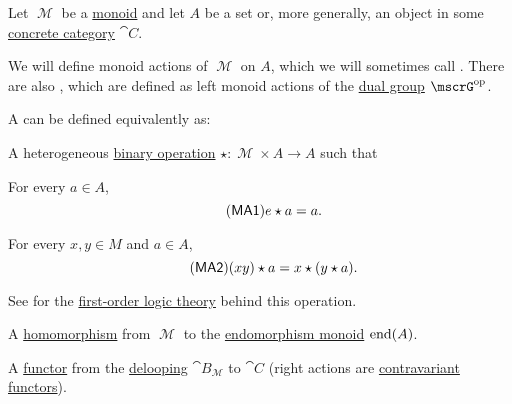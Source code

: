 \begin{definition}\label{def:monoid_action}
  Let \( \mscrM \) be a \hyperref[def:unital_magma/monoid]{monoid} and let \( A \) be a set or, more generally, an object in some \hyperref[def:concrete_category]{concrete category} \( \cat{C} \).

  We will define monoid actions of \( \mscrM \) on \( A \), which we will sometimes call . There are also , which are defined as left monoid actions of the \hyperref[def:group/duality]{dual group} \( \mscrG^{\opcat} \).

  A  can be defined equivalently as:
  \begin{thmenum}
     A heterogeneous \hyperref[def:magma]{binary operation} \( \star: \mscrM \times A \to A \) such that
    \begin{thmenum}
       For every \( a \in A \),
      \begin{equation}\label{eq:def:monoid_action/operation/identity}\tag{\logic{MA1}}
        e \star a = a.
      \end{equation}

       For every \( x, y \in M \) and \( a \in A \),
      \begin{equation}\label{eq:def:monoid_action/operation/compatibility}\tag{\logic{MA2}}
        (xy) \star a = x \star (y \star a).
      \end{equation}
    \end{thmenum}

    See  for the \hyperref[def:first_order_theory]{first-order logic theory} behind this operation.

     A \hyperref[def:unital_magma/homomorphism]{homomorphism} from \( \mscrM \) to the \hyperref[def:endomorphism_monoid]{endomorphism monoid} \( \operatorname{end}(A) \).

     A \hyperref[def:functor]{functor} from the \hyperref[def:monoid_delooping]{delooping} \( \cat{B}_\mscrM \) to \( \cat{C} \) (right actions are \hyperref[rem:contravariant_functor]{contravariant functors}).
  \end{thmenum}
\end{definition}

